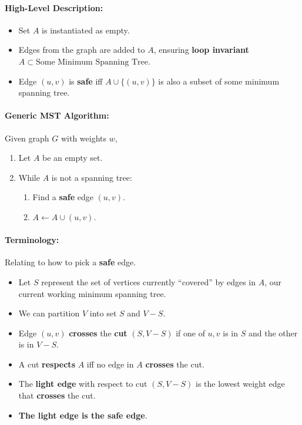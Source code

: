 \documentclass[a4paper,12pt]{report}
\begin{document}
\paragraph{High-Level Description: } 
\begin{itemize}
\item Set $A$ is instantiated as empty.
\item Edges from the graph are added to $A$, ensuring \textbf{loop invariant} $A\subset\text{Some Minimum Spanning Tree}$. 
\item Edge $(u,v)$ is \textbf{safe} iff $A \cup \{(u,v)\}$ is also a subset of some minimum spanning tree.
\end{itemize}

\paragraph{Generic MST Algorithm: } Given graph $G$ with weights $w$,
\begin{enumerate}
\item Let $A$ be an empty set. 
\item While $A$ is not a spanning tree: 
\begin{enumerate}
\item Find a \textbf{safe} edge $(u,v)$.
\item $A \leftarrow A \cup (u,v)$.
\end{enumerate}
\end{enumerate}

\paragraph{Terminology: } Relating to how to pick a \textbf{safe} edge.
\begin{itemize}
\item Let $S$ represent the set of vertices currently ``covered'' by edges in $A$, our current working minimum spanning tree.
\item We can partition $V$ into set $S$ and $V-S$.
\item Edge $(u,v)$ \textbf{crosses} the \textbf{cut} $(S,V-S)$ if one of $u,v$ is in $S$ and the other is in $V-S$.
\item A cut \textbf{respects} $A$ iff no edge in $A$ \textbf{crosses} the cut. 
\item The \textbf{light edge} with respect to cut $(S,V-S)$ is the lowest weight edge that \textbf{crosses} the cut. 
\item \textbf{The light edge is the safe edge}.
\end{itemize}
\end{document}
